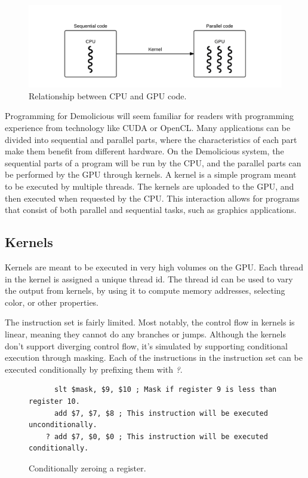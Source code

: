 \begin{figure}[H]
	\centering
	\includegraphics[width=\textwidth]{system_overview/diagrams/programming_model_cpu_gpu.png}
	\caption{Relationship between CPU and GPU code.}
	\label{fig:programming_model_cpu_gpu}
\end{figure}
Programming for Demolicious will seem familiar for readers with programming experience from technology like CUDA or OpenCL. 
Many applications can be divided into sequential and parallel parts,
where the characteristics of each part make them benefit from different hardware.
On the Demolicious system, the sequential parts of a program will be run by the CPU, and the parallel parts can be performed by the GPU through kernels.
A kernel is a simple program meant to be executed by multiple threads.
The kernels are uploaded to the GPU, and then executed when requested by the CPU.
This interaction allows for programs that consist of both parallel and sequential tasks, such as graphics applications.

\subsection{Kernels}
Kernels are meant to be executed in very high volumes on the GPU.
Each thread in the kernel is assigned a unique thread id.
The thread id can be used to vary the output from kernels, 
by using it to compute memory addresses, selecting color, or other properties.

The instruction set is fairly limited.
Most notably, the control flow in kernels is linear, meaning they cannot do any branches or jumps.
Although the kernels don't support diverging control flow,
it's simulated by supporting conditional execution through masking.
Each of the instructions in the instruction set can be executed conditionally by prefixing them with \textit{?}.

\begin{figure}[H]
	\centering
	\begin{verbatim}
	  slt $mask, $9, $10 ; Mask if register 9 is less than register 10.
	  add $7, $7, $8 ; This instruction will be executed unconditionally.
	? add $7, $0, $0 ; This instruction will be executed conditionally.
	\end{verbatim}
	\caption{Conditionally zeroing a register.}
	\label{fig:conditional_execution}
\end{figure}

